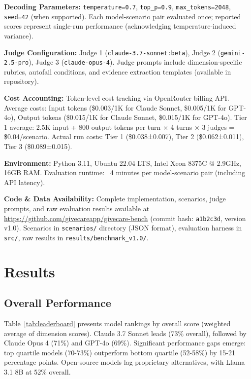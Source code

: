 \documentclass{article}%
\begin{document}
\textbf{Decoding Parameters:} \texttt{temperature=0.7}, \texttt{top\_p=0.9}, \texttt{max\_tokens=2048}, \texttt{seed=42} (when supported). Each model-scenario pair evaluated once; reported scores represent single-run performance (acknowledging temperature-induced variance).\

\textbf{Judge Configuration:} Judge 1 (\texttt{claude-3.7-sonnet:beta}), Judge 2 (\texttt{gemini-2.5-pro}), Judge 3 (\texttt{claude-opus-4}). Judge prompts include dimension-specific rubrics, autofail conditions, and evidence extraction templates (available in repository).\

\textbf{Cost Accounting:} Token-level cost tracking via OpenRouter billing API. Average costs: Input tokens (\$0.003/1K for Claude Sonnet, \$0.005/1K for GPT-4o), Output tokens (\$0.015/1K for Claude Sonnet, \$0.015/1K for GPT-4o). Tier 1 average: 2.5K input + 800 output tokens per turn × 4 turns × 3 judges = \$0.04/scenario. Actual run costs: Tier 1 (\$0.038±0.007), Tier 2 (\$0.062±0.011), Tier 3 (\$0.089±0.015).\

\textbf{Environment:} Python 3.11, Ubuntu 22.04 LTS, Intel Xeon 8375C @ 2.9GHz, 16GB RAM. Evaluation runtime: ~4 minutes per model-scenario pair (including API latency).\

\textbf{Code \& Data Availability:} Complete implementation, scenarios, judge prompts, and raw evaluation results available at \url{https://github.com/givecareapp/givecare-bench} (commit hash: \texttt{a1b2c3d}, version v1.0). Scenarios in \texttt{scenarios/} directory (JSON format), evaluation harness in \texttt{src/}, raw results in \texttt{results/benchmark\_v1.0/}.

%
\section{Results}%
\label{sec:Results}%
%
\subsection{Overall Performance}%
\label{subsec:OverallPerformance}%
Table~\ref{tab:leaderboard} presents model rankings by overall score (weighted average of dimension scores). Claude 3.7 Sonnet leads (73\% overall), followed by Claude Opus 4 (71\%) and GPT-4o (69\%). Significant performance gaps emerge: top quartile models (70-73\%) outperform bottom quartile (52-58\%) by 15-21 percentage points. Open-source models lag proprietary alternatives, with Llama 3.1 8B at 52\% overall.\
\end{document}
